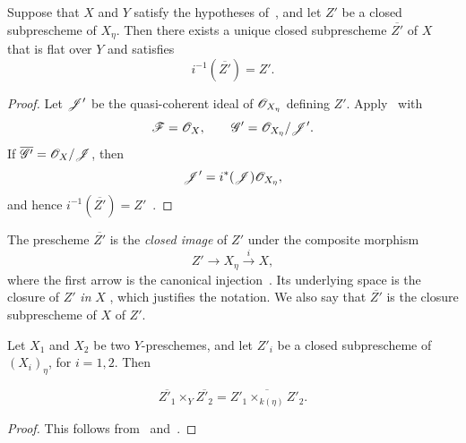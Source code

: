 \begin{proposition}[2.8.5]
\label{IV.2.8.5}
Suppose that $X$ and $Y$ satisfy the hypotheses
of~, and let $Z'$ be a closed subprescheme of
$X_\eta$. Then there exists a unique closed subprescheme
$\overline{Z'}$ of $X$ that is flat over $Y$ and satisfies
\[
  i^{-1}(\overline{Z'})=Z'.
\]
\end{proposition}

\begin{proof}
Let $\mathscr{J}'$ be the quasi-coherent ideal of $\mathscr{O}_{X_\eta}$
defining $Z'$. Apply~ with
\[
  \mathscr{F}=\mathscr{O}_X,\qquad
  \mathscr{G}'=\mathscr{O}_{X_\eta}/\mathscr{J}'.
\]
If $\overline{\mathscr{G}'}=\mathscr{O}_X/\mathscr{J}$, then
\[
  \mathscr{J}'=i^*(\mathscr{J})\mathscr{O}_{X_\eta},
\]
and hence
$i^{-1}(\overline{Z'})=Z'$~.
\end{proof}

The prescheme $\overline{Z'}$ is the \emph{closed image} of $Z'$ under
the composite morphism
\[
  Z'\longrightarrow X_\eta\xrightarrow{i}X,
\]
where the first arrow is the canonical injection~.
Its underlying space is the closure of $Z'$ \emph{in} $X$
, which justifies the notation. We also say that
$\overline{Z'}$ is the closure subprescheme of $X$ of $Z'$.

\begin{corollary}[2.8.6]
\label{IV.2.8.6}
Let $X_1$ and $X_2$ be two $Y$-preschemes, and let $Z'_i$ be a closed
subprescheme of $(X_i)_\eta$, for $i=1,2$. Then
\end{corollary}

\begin{env}[2.8.6.1]
\label{IV.2.8.6.1}
\[
  \overline{Z'_1}\times_Y\overline{Z'_2}
    =
  \overline{Z'_1\times_{k(\eta)}Z'_2}.
\]
\end{env}

\begin{proof}
This follows from~ and~.
\end{proof}
